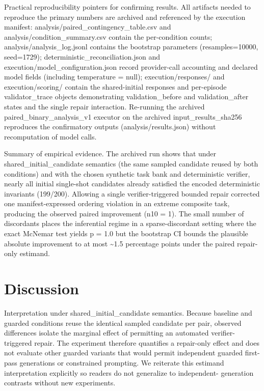 \documentclass[conference]{IEEEtran}
\begin{document}
Practical reproducibility pointers for confirming results. All artifacts needed to reproduce the primary numbers are archived and referenced by the execution manifest: analysis/paired\_contingency\_table.csv and analysis/condition\_summary.csv contain the per-condition counts; analysis/analysis\_log.jsonl contains the bootstrap parameters (resamples=10000, seed=1729); deterministic\_reconciliation.json and execution/model\_configuration.json record provider-call accounting and declared model fields (including temperature = null); execution/responses/ and execution/scoring/ contain the shared-initial responses and per-episode validator\_trace objects demonstrating validation\_before and validation\_after states and the single repair interaction. Re-running the archived paired\_binary\_analysis\_v1 executor on the archived input\_results\_sha256 reproduces the confirmatory outputs (analysis/results.json) without recomputation of model calls.

Summary of empirical evidence. The archived run shows that under shared\_initial\_candidate semantics (the same sampled candidate reused by both conditions) and with the chosen synthetic task bank and deterministic verifier, nearly all initial single-shot candidates already satisfied the encoded deterministic invariants (199/200). Allowing a single verifier-triggered bounded repair corrected one manifest-expressed ordering violation in an extreme composite task, producing the observed paired improvement (n10 = 1). The small number of discordants places the inferential regime in a sparse-discordant setting where the exact McNemar test yields p = 1.0 but the bootstrap CI bounds the plausible absolute improvement to at most \textasciitilde{}1.5 percentage points under the paired repair-only estimand.

\section{Discussion}
Interpretation under shared\_initial\_candidate semantics. Because baseline and guarded conditions reuse the identical sampled candidate per pair, observed differences isolate the marginal effect of permitting an automated verifier-triggered repair. The experiment therefore quantifies a repair-only effect and does not evaluate other guarded variants that would permit independent guarded first-pass generations or constrained prompting. We reiterate this estimand interpretation explicitly so readers do not generalize to independent- generation contrasts without new experiments.
\end{document}
